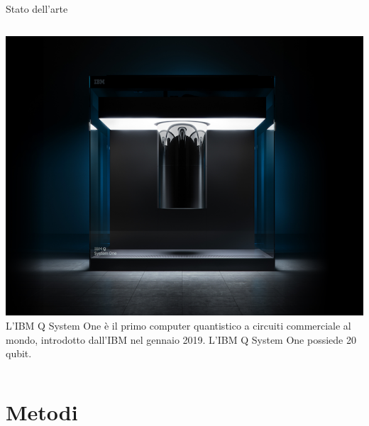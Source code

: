 \documentclass{beamer}
\begin{document}
    \begin{frame}{Stato dell'arte}
        \begin{columns}
            \includegraphics[width=\textwidth]{gfx/ibm_q_system_one.png}
            L'IBM Q System One è il primo computer quantistico a circuiti commerciale al mondo, 
            introdotto dall'IBM nel gennaio 2019. L'IBM Q System One possiede 20 qubit. 
        \end{columns}
    \end{frame}

    \section{Metodi}
\end{document}
